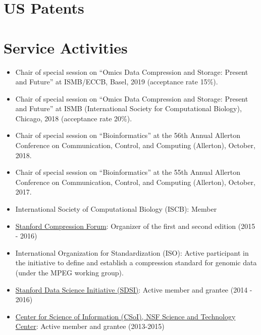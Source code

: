 \documentclass[11pt,a4paper,sans]{moderncv}        %
\begin{document}
\section{US Patents}

{}


\section{Service Activities}
\begin{itemize}
\item Chair of special session on ``Omics Data Compression and Storage: Present and Future'' at ISMB/ECCB, Basel, 2019 (acceptance rate 15\%).
\item Chair of special session on ``Omics Data Compression and Storage: Present and Future'' at ISMB (International Society for Computational Biology), Chicago, 2018 (acceptance rate 20\%).
\item Chair of special session on ``Bioinformatics'' at the 56th Annual Allerton Conference on Communication, Control, and Computing (Allerton), October, 2018.
\item Chair of special session on ``Bioinformatics'' at the 55th Annual Allerton Conference on Communication, Control, and Computing (Allerton), October, 2017.
\end{itemize}


\begin{itemize}
\item International Society of Computational Biology (ISCB): Member 
\item \href{https://compression.stanford.edu/}{Stanford Compression Forum}: Organizer of the first and second edition (2015 - 2016)
\item International Organization for Standardization (ISO): Active participant in the initiative to define and establish a compression standard for genomic data (under the MPEG working group).
\item \href{https://sdsi.stanford.edu/}{Stanford Data Science Initiative (SDSI)}: Active member and grantee (2014 - 2016)
\item \href{https://www.soihub.org/}{Center for Science of Information (CSoI), NSF Science and Technology Center}: Active member and grantee (2013-2015)
\end{itemize}
\vspace{5pt}
\end{document}
